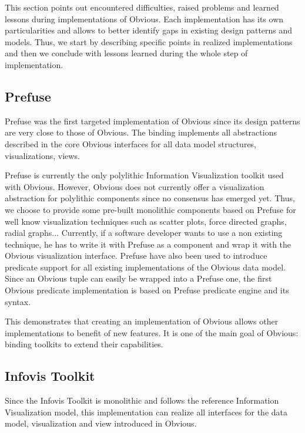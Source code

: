 This section points out encountered difficulties, raised problems and learned lessons during implementations of Obvious. Each implementation has its own particularities and allows  to better identify gaps in existing design patterns and models. Thus, we start by describing specific points in realized implementations and then we conclude with lessons learned during the whole step of implementation.

\subsection{Prefuse}

Prefuse was the first targeted implementation of Obvious since its design patterns are very close to those of Obvious.  The binding implements all abstractions described in the core Obvious interfaces for all data model structures, visualizations, views.

Prefuse is currently the only polylithic Information Visualization toolkit used with Obvious. However, Obvious does not currently offer a visualization abstraction for polylithic components since no consensus has emerged yet. Thus, we choose to provide some pre-built monolithic components based on Prefuse for well know visualization techniques such as scatter plots, force directed graphs, radial graphs... Currently, if a software developer wants to use a non existing technique, he has to write it with Prefuse as a component and wrap it with the Obvious visualization interface. Prefuse have also been used to introduce predicate support for all existing implementations of the Obvious data model. Since an Obvious tuple can easily be wrapped into a Prefuse one, the first Obvious predicate implementation is based on Prefuse predicate engine and its syntax.

This demonstrates that creating an implementation of Obvious allows other implementations to benefit of new features. It is one of the main goal of Obvious: binding toolkits to extend their capabilities. 

\subsection{Infovis Toolkit}

Since the Infovis Toolkit is monolithic and follows the reference Information Visualization model, this implementation can realize all interfaces for the data model, visualization and view introduced in Obvious.

